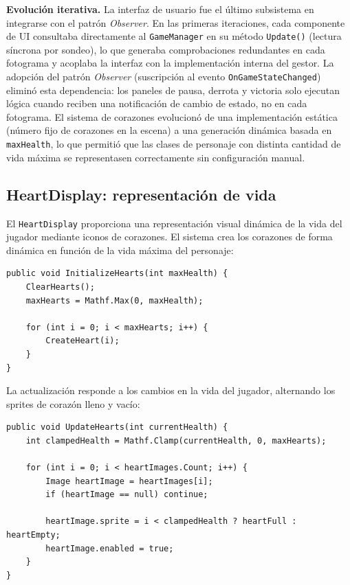 \textbf{Evolución iterativa.} La interfaz de usuario fue el último subsistema en integrarse con el patrón \textit{Observer}. En las primeras iteraciones, cada componente de UI consultaba directamente al \texttt{GameManager} en su método \texttt{Update()} (lectura síncrona por sondeo), lo que generaba comprobaciones redundantes en cada fotograma y acoplaba la interfaz con la implementación interna del gestor. La adopción del patrón \textit{Observer} (suscripción al evento \texttt{OnGameStateChanged}) eliminó esta dependencia: los paneles de pausa, derrota y victoria solo ejecutan lógica cuando reciben una notificación de cambio de estado, no en cada fotograma. El sistema de corazones evolucionó de una implementación estática (número fijo de corazones en la escena) a una generación dinámica basada en \texttt{maxHealth}, lo que permitió que las clases de personaje con distinta cantidad de vida máxima se representasen correctamente sin configuración manual.

\subsection{HeartDisplay: representación de vida}


El \texttt{HeartDisplay} proporciona una representación visual dinámica de la vida del jugador mediante iconos de corazones. El sistema crea los corazones de forma dinámica en función de la vida máxima del personaje:

\begin{lstlisting}
public void InitializeHearts(int maxHealth) {
    ClearHearts();
    maxHearts = Mathf.Max(0, maxHealth);
    
    for (int i = 0; i < maxHearts; i++) {
        CreateHeart(i);
    }
}
\end{lstlisting}


La actualización responde a los cambios en la vida del jugador, alternando los sprites de corazón lleno y vacío:

\begin{lstlisting}
public void UpdateHearts(int currentHealth) {
    int clampedHealth = Mathf.Clamp(currentHealth, 0, maxHearts);
    
    for (int i = 0; i < heartImages.Count; i++) {
        Image heartImage = heartImages[i];
        if (heartImage == null) continue;
        
        heartImage.sprite = i < clampedHealth ? heartFull : heartEmpty;
        heartImage.enabled = true;
    }
}
\end{lstlisting}


